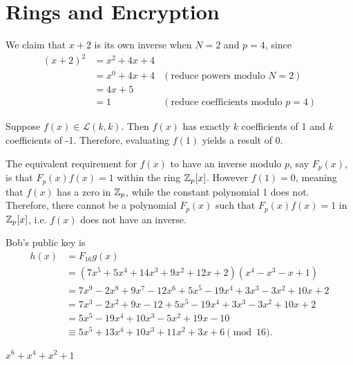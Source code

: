 \section{Rings and Encryption}
\begin{questions}
    \item We claim that $x+2$ is its own inverse when $N = 2$ and $p = 4$, since
    \begin{align*}
        (x+2)^2 &= x^2 + 4x + 4\\
        &= x^0 + 4x + 4 & (\text{reduce powers modulo } N = 2)\\
        &= 4x + 5\\
        &= 1 & (\text{reduce coefficients modulo } p = 4)
    \end{align*}

    \item Suppose $f(x) \in \mathcal{L}(k,k)$. Then $f(x)$ has exactly $k$ coefficients of 1 and $k$ coefficients of -1. Therefore, evaluating $f(1)$ yields a result of 0.

    The equivalent requirement for $f(x)$ to have an inverse modulo $p$, say $F_p(x)$, is that $F_p(x)f(x) = 1$ within the ring $\mathbb{Z}_p[x]$. However $f(1) = 0$, meaning that $f(x)$ has a zero in $\mathbb{Z}_p$, while the constant polynomial 1 does not. Therefore, there cannot be a polynomial $F_p(x)$ such that $F_p(x)f(x) = 1$ in $\mathbb{Z}_p[x]$, i.e. $f(x)$ does not have an inverse.

    \item Bob's public key is
    \begin{align*}
        h(x) &= F_{16}g(x)\\
        &= (7x^5 + 5x^4 + 14x^3 + 9x^2 + 12x + 2)(x^4 - x^3 - x + 1)\\
        &= 7x^9 - 2x^8 + 9x^7 - 12x^6 + 5x^5 - 19x^4 + 3x^3 - 3x^2 + 10x + 2\\
        &= 7x^3 - 2x^2 + 9x - 12 + 5x^5 - 19x^4 + 3x^3 - 3x^2 + 10x + 2\\
        &= 5x^5 - 19x^4 + 10x^3 - 5x^2 + 19x - 10\\
        &\equiv 5x^5 + 13x^4 + 10x^3 + 11x^2 + 3x + 6 \pmod{16}.
    \end{align*}

    \item $x^6 + x^4 + x^2 + 1$


\end{questions}
